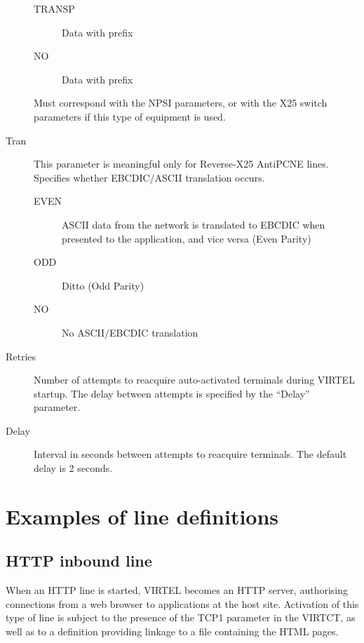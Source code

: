 \documentclass[letterpaper,10pt,english]{sphinxmanual}
\begin{document}
\begin{description}
\begin{description}
\item[{TRANSP}] \leavevmode
Data with prefix

\item[{NO}] \leavevmode
Data with prefix

\end{description}

Must correspond with the NPSI parameters, or with the X25 switch
parameters if this type of equipment is used.

\item[{Tran}] \leavevmode
This parameter is meaningful only for Reverse-X25 AntiPCNE lines.
Specifies whether EBCDIC/ASCII translation occurs.
\begin{description}
\item[{EVEN}] \leavevmode
ASCII data from the network is translated to EBCDIC when presented
to the application, and vice versa (Even Parity)

\item[{ODD}] \leavevmode
Ditto (Odd Parity)

\item[{NO}] \leavevmode
No ASCII/EBCDIC translation

\end{description}

\item[{Retries}] \leavevmode
Number of attempts to reacquire auto-activated terminals during
VIRTEL startup. The delay between attempts is specified by the
“Delay” parameter.

\item[{Delay}] \leavevmode
Interval in seconds between attempts to reacquire terminals. The
default delay is 2 seconds.

\end{description}


\section{Examples of line definitions}
\label{\detokenize{connectivity_guide:examples-of-line-definitions}}

\subsection{HTTP inbound line}
\label{\detokenize{connectivity_guide:http-inbound-line}}
When an HTTP line is started, VIRTEL becomes an HTTP server, authorising connections from a web browser to applications at the host site. Activation of this type of line is subject to the presence of the TCP1 parameter in the VIRTCT, as well as to a definition providing linkage to a file containing the HTML pages.
\end{document}

